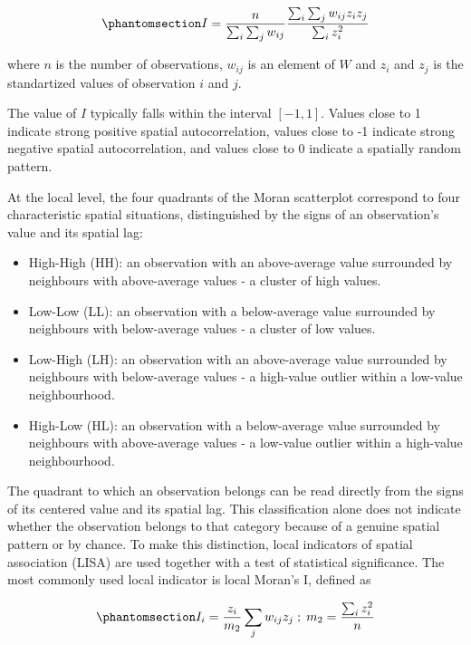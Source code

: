 \documentclass[
  english,
  12pt,
  a4paper,
]{article}
\begin{document}
\begin{equation}\phantomsection\label{eq-global_i}{
I = \frac{n}{\sum_i \sum_j w_{ij}} \frac{\sum_i \sum_j w_{ij} z_i z_j}{\sum_i z_i^2}
}\end{equation}

where \(n\) is the number of observations, \(w_{ij}\) is an element of
\(W\) and \(z_i\) and \(z_j\) is the standartized values of observation
\(i\) and \(j\).

The value of \(I\) typically falls within the interval \([-1, 1]\).
Values close to 1 indicate strong positive spatial autocorrelation,
values close to -1 indicate strong negative spatial autocorrelation, and
values close to 0 indicate a spatially random pattern.

At the local level, the four quadrants of the Moran scatterplot
correspond to four characteristic spatial situations, distinguished by
the signs of an observation's value and its spatial lag:

\begin{itemize}
\item
  High-High (HH): an observation with an above-average value surrounded
  by neighbours with above-average values - a cluster of high values.
\item
  Low-Low (LL): an observation with a below-average value surrounded by
  neighbours with below-average values - a cluster of low values.
\item
  Low-High (LH): an observation with an above-average value surrounded
  by neighbours with below-average values - a high-value outlier within
  a low-value neighbourhood.
\item
  High-Low (HL): an observation with a below-average value surrounded by
  neighbours with above-average values - a low-value outlier within a
  high-value neighbourhood.
\end{itemize}

The quadrant to which an observation belongs can be read directly from
the signs of its centered value and its spatial lag. This classification
alone does not indicate whether the observation belongs to that category
because of a genuine spatial pattern or by chance. To make this
distinction, local indicators of spatial association (LISA) are used
together with a test of statistical significance. The most commonly used
local indicator is local Moran's I, defined as

\begin{equation}\phantomsection\label{eq-local_i}{
I_i = \frac{z_i}{m_2} \sum_{j} w_{ij}z_j \; ; \; m_2 = \frac{\sum_i z_i^2}{n}
}\end{equation}
\end{document}
